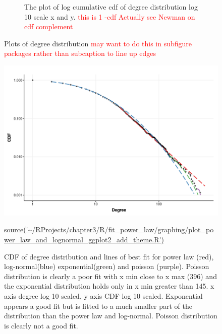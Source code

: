 \begin{figure}
\begin{subfigure}[t]{0.45\textwidth}
        \caption{The plot of log cumulative cdf of degree distribution log 10 scale x and y. \textcolor{red}{this is 1 -cdf Actually see Newman on cdf complement}} \label{fig:log_degree_distribution}
    \end{subfigure}
    \caption{Plots of degree distribution \textcolor{red}{may want to do this in subfigure packages rather than subcaption to line up edges}}
    \label{fig:Plots of degree distribution}
\end{figure}




\begin{figure}
    \centering
    \includegraphics[width=\textwidth]{images/chapter3/poweRlaw/RPlot_plot_powerlaw_xmin_set_for_each_distribution_add_theme.png}
    \caption{CDF of degree distribution and lines of best fit for power law (red), log-normal(blue) exponential(green) and poisson (purple). Poisson distribution is clearly a poor fit with x min close to x max (396) and the exponential distribution holds only in x min greater than 145. x axis degree log 10 scaled, y axis CDF log 10 scaled. Exponential appears a good fit but is fitted to a much smaller part of the distribution than the power law and log-normal. Poisson distribution is clearly not a good fit.} 
    \small\url{source('~/RProjects/chapter3/R/fit_power_law/graphing/plot_power_law_and_lognormal_ggplot2_add_theme.R')}
    \label{fig:CDF degreel_theme}
\end{figure}
